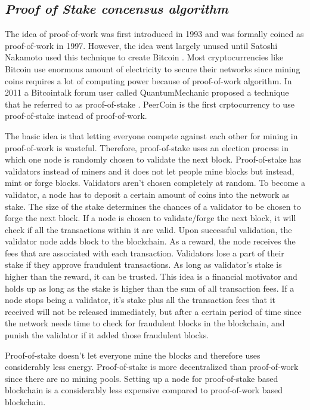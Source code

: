 \documentclass[conference,a4paper,12pt]{IEEEtran}
\begin{document}
\subsection{\textit{Proof of Stake concensus algorithm}}
The idea of proof-of-work was first introduced in 1993 \cite{pvp} and was formally coined as proof-of-work in 1997. However, the idea went largely unused until Satoshi Nakamoto used this technique to create Bitcoin \cite{bitcoin_article}. Most cryptocurrencies like Bitcoin use enormous amount of electricity to secure their networks since mining coins requires a lot of computing power because of proof-of-work algorithm. In 2011 a Bitcointalk forum user called QuantumMechanic proposed a technique that he referred to as proof-of-stake \cite{bitcointalk}. PeerCoin \cite{peercoin} is the first crptocurrency to use proof-of-stake instead of proof-of-work.

The basic idea is that letting everyone compete against each other for mining in proof-of-work is wasteful. Therefore, proof-of-stake uses an election process in which one node is randomly chosen to validate the next block. Proof-of-stake has validators instead of miners and it does not let people mine blocks but instead, mint or forge blocks. Validators aren't chosen completely at random. To become a validator, a node has to deposit a certain amount of coins into the network as stake. The size of the stake determines the chances of a validator to be chosen to forge the next block. If a node is chosen to validate/forge the next block, it will check if all the transactions within it are valid. Upon successful validation, the validator node adds block to the blockchain. As a reward, the node receives the fees that are associated with each transaction. Validators lose a part of their stake if they approve fraudulent transactions. As long as validator's stake is higher than the reward, it can be trusted. This idea is a financial motivator and holds up as long as the stake is higher than the sum of all transaction fees. If a node stops being a validator, it's stake plus all the transaction fees that it received will not be released immediately, but after a certain period of time since the network needs time to check for fraudulent blocks in the blockchain, and punish the validator if it added those fraudulent blocks.

Proof-of-stake doesn't let everyone mine the blocks and therefore uses considerably less energy. Proof-of-stake is more decentralized than proof-of-work since there are no mining pools. Setting up a node for proof-of-stake based blockchain is a considerably less expensive compared to proof-of-work based blockchain.
\end{document}
